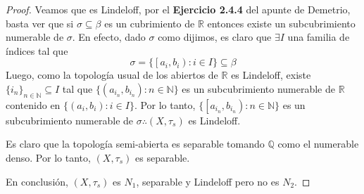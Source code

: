 \documentclass{article}
\theoremstyle{definition}
\newcommand{\R}{\mathbb{R}}
\newcommand{\N}{\mathbb{N}}
\newcommand{\Q}{\mathbb{Q}}
\newcommand{\coint}[2]{\left[ #1, #2 \right)}
\begin{document}
\begin{proof}
    Veamos que es Lindeloff, por el \textbf{Ejercicio 2.4.4} del apunte de Demetrio, basta ver que si \( \sigma \subseteq \beta \) es un cubrimiento de \( \R \) entonces existe un subcubrimiento numerable de \( \sigma \).
    En efecto, dado \( \sigma \) como dijimos, es claro que \( \exists I \) una familia de índices tal que \[
        \sigma = \{ \coint{a_i}{b_i} : i \in I \} \subseteq \beta
    \]
    Luego, como la topología usual de los abiertos de \( \R \) es Lindeloff, existe \( {\{ i_n \}}_{n \in \N} \subseteq I \) tal que \( \{ (a_{i_n}, b_{i_n}) : n \in \N \} \) es un subcubrimiento numerable de \( \R \) contenido en
    \( \{ (a_i, b_i) : i \in I \} \). Por lo tanto, \( \{ \coint{a_{i_n}}{b_{i_n}} : n \in \N \} \) es un subcubrimiento numerable de \( \sigma \therefore (X, \tau_s) \) es Lindeloff.

    Es claro que la topología semi-abierta es separable tomando \( \Q \) como el numerable denso. Por lo tanto, \( (X, \tau_s) \) es separable.

    En conclusión, \( (X, \tau_s) \) es \( N_1 \), separable y Lindeloff pero no es \( N_2 \).
\end{proof}
\end{document}
